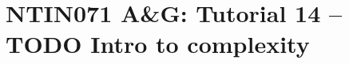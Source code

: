 \documentclass[a4paper,12pt]{amsart}
\begin{document}



\section*{NTIN071 A\&G: Tutorial 14 -- TODO Intro to complexity}


\medskip


\medskip






    
    
    
    
\end{document}
